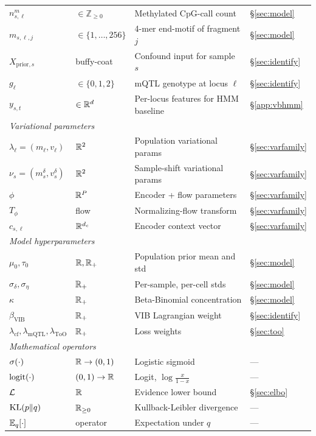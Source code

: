 \begin{center}
\begin{tabular}{llll}
$n^m_{s,\ell}$ & $\in\mathbb{Z}_{\ge 0}$ & Methylated CpG-call count & §\ref{sec:model} \\
$m_{s,\ell,j}$ & $\in\{1,\dots,256\}$ & 4-mer end-motif of fragment $j$ & §\ref{sec:model} \\
$X_{\mathrm{prior},s}$ & buffy-coat & Confound input for sample $s$ & §\ref{sec:identify} \\
$g_\ell$ & $\in\{0,1,2\}$ & mQTL genotype at locus $\ell$ & §\ref{sec:identify} \\
$y_{s,t}$ & $\in\mathbb{R}^d$ & Per-locus features for HMM baseline & §\ref{app:vbhmm} \\
\midrule
\multicolumn{4}{l}{\emph{Variational parameters}} \\
$\lambda_\ell=(m_\ell,v_\ell)$ & $\mathbb{R}^2$ & Population variational params & §\ref{sec:varfamily} \\
$\nu_s=(m_s^\delta,v_s^\delta)$ & $\mathbb{R}^2$ & Sample-shift variational params & §\ref{sec:varfamily} \\
$\phi$ & $\mathbb{R}^P$ & Encoder + flow parameters & §\ref{sec:varfamily} \\
$T_\phi$ & flow & Normalizing-flow transform & §\ref{sec:varfamily} \\
$c_{s,\ell}$ & $\mathbb{R}^{d_c}$ & Encoder context vector & §\ref{sec:varfamily} \\
\midrule
\multicolumn{4}{l}{\emph{Model hyperparameters}} \\
$\mu_0,\tau_0$ & $\mathbb{R},\mathbb{R}_+$ & Population prior mean and std & §\ref{sec:model} \\
$\sigma_\delta,\sigma_\eta$ & $\mathbb{R}_+$ & Per-sample, per-cell stds & §\ref{sec:model} \\
$\kappa$ & $\mathbb{R}_+$ & Beta-Binomial concentration & §\ref{sec:model} \\
$\beta_{\mathrm{VIB}}$ & $\mathbb{R}_+$ & VIB Lagrangian weight & §\ref{sec:identify} \\
$\lambda_{\mathrm{cf}},\lambda_{\mathrm{mQTL}},\lambda_{\mathrm{ToO}}$ & $\mathbb{R}_+$ & Loss weights & §\ref{sec:too} \\
\midrule
\multicolumn{4}{l}{\emph{Mathematical operators}} \\
$\sigma(\cdot)$ & $\mathbb{R}\to(0,1)$ & Logistic sigmoid & — \\
$\mathrm{logit}(\cdot)$ & $(0,1)\to\mathbb{R}$ & Logit, $\log\frac{x}{1-x}$ & — \\
$\mathcal{L}$ & $\mathbb{R}$ & Evidence lower bound & §\ref{sec:elbo} \\
$\mathrm{KL}(p\|q)$ & $\mathbb{R}_{\ge 0}$ & Kullback-Leibler divergence & — \\
$\mathbb{E}_q[\cdot]$ & operator & Expectation under $q$ & — \\
\bottomrule
\end{tabular}
\end{center}
